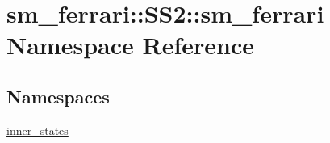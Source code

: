 \hypertarget{namespacesm__ferrari_1_1SS2_1_1sm__ferrari}{}\section{sm\+\_\+ferrari\+:\+:S\+S2\+:\+:sm\+\_\+ferrari Namespace Reference}
\label{namespacesm__ferrari_1_1SS2_1_1sm__ferrari}
\subsection*{Namespaces}
\begin{DoxyCompactItemize}
\item 
 \hyperlink{namespacesm__ferrari_1_1SS2_1_1sm__ferrari_1_1inner__states}{inner\+\_\+states}
\end{DoxyCompactItemize}

